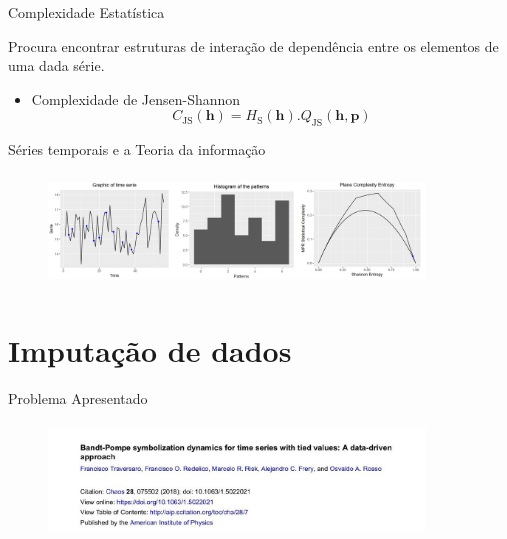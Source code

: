 \documentclass{beamer} %
\begin{document}
\begin{frame}{Complexidade Estatística}

Procura encontrar estruturas de interação de dependência entre os elementos de uma dada série.

\vspace{0.8cm}

\begin{itemize}
\item Complexidade de Jensen-Shannon 
  \begin{equation}
  	C_{\text{JS}}(\bm h) = H_{\text{S}}(\bm h) . Q_{\text{JS}}(\bm h, \bm p)
  \end{equation}
\end{itemize}

\end{frame}

\begin{frame}{Séries temporais e a Teoria da informação}
    \begin{figure}
      \centering
       \includegraphics[width=10cm,height=3cm]{graphs.png}
    \end{figure}
\end{frame}

\section{Imputação de dados}

\begin{frame}{Problema Apresentado}
    \begin{figure}
      \centering
       \includegraphics[width=10cm,height=3cm]{index.jpeg}
    \end{figure}
\end{frame}
\end{document}
